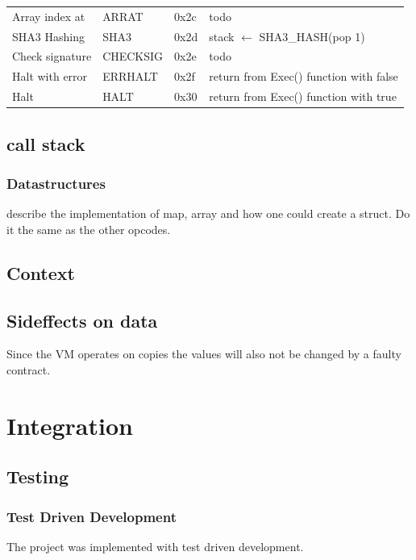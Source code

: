 \begin{table}[]
\begin{tabular}{@{}llll@{}}
Array index at       & ARRAT             & 0x2c            & todo                                                     \\
SHA3 Hashing         & SHA3              & 0x2d            & stack $\leftarrow$ SHA3\_HASH(pop 1)                                \\
Check signature      & CHECKSIG          & 0x2e            & todo                                                     \\
Halt with error      & ERRHALT           & 0x2f            & return from Exec() function with false                   \\
Halt                 & HALT              & 0x30            & return from Exec() function with true                    \\ \bottomrule
\end{tabular}
\end{table}

\subsection{call stack}

\subsubsection{Datastructures}
describe the implementation of map, array and how one could create a struct. Do it the same as the other opcodes.

\subsection{Context}

\subsection{Sideffects on data}

Since the VM operates on copies the values will also not be changed by a faulty contract.

\section{Integration}

\subsection{Testing}
\subsubsection{Test Driven Development}
The project was implemented with test driven development. 

